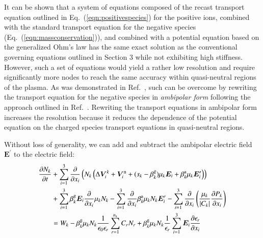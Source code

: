 \documentclass{warpdoc}
\newcommand{\ns}{{n_{\rm s}}}
\renewcommand{\vec}[1]{\bm{#1}}
\begin{document}
It can be shown that a system of equations composed of the recast transport equation outlined in Eq.\ (\ref{eqn:positivespecies}) for the positive ions, combined with the standard transport equation for the negative species (Eq.\ (\ref{eqn:massconservation})), and combined with a potential equation based on the generalized Ohm's law \cite{jcp:2011:parent} has the same exact solution as the conventional governing equations outlined in Section 3 while not exhibiting high stiffness. However, such a set of equations would yield a rather low resolution and require significantly more nodes to reach the same accuracy within quasi-neutral regions of the plasma. As was  demonstrated in Ref.\ \cite{jcp:2013:parent}, such can be overcome by rewriting the transport equation for the negative species in \emph{ambipolar form} following the approach outlined in Ref.\ \cite{jcp:2011:parent:2}. Rewriting the transport equations in ambipolar form increases the resolution because it reduces the dependence of the potential equation on the charged species transport equations in quasi-neutral regions.     

Without loss of generality, we can add and subtract the ambipolar electric field $\vec{E}^\prime$ to the electric field:
%
\begin{align}
  \frac{\partial N_k}{\partial t} &+ \sum_{i=1}^3 \frac{\partial}{\partial x_i}  \left(N_k \left( \Delta \vec{V}^k_i + \vec{V}^{\rm n}_i+ (s_k-\beta_k^{\rm g}) \mu_k  \vec{E}_i + \beta^{\rm a}_k \mu_k \vec{E}_i^\prime \right)\right) 
\nonumber \\
&+ \sum_{i=1}^3 \beta_k^{\rm g} \vec{E}_i \frac{\partial }{\partial x_i} \mu_{k} N_{k}
- \sum_{i=1}^3  \frac{\partial}{\partial x_i}  \beta_k^{\rm a}\mu_k N_k \vec{E}^\prime_i
- \sum_{i=1}^3  \frac{\partial}{\partial x_i}  \left( 
   \frac{\mu_k }{|C_k|} \frac{\partial P_k}{\partial x_i}
\right)
\nonumber \\
&= W_k
-\beta_k^{\rm g} \mu_{k} N_{k}\frac{1}{\epsilon_0 \epsilon_r} \sum_{r=1}^\ns C_r N_r 
+\beta_k^{\rm g} \mu_{k} N_{k}\frac{1}{\epsilon_r} \sum_{i=1}^3 \vec{E}_i \frac{\partial \epsilon_r}{\partial x_i}  
\label{eqn:negspecies1}
\end{align}
%
\end{document}
